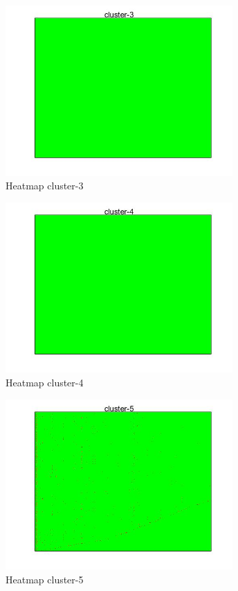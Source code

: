 \begin{figure}[htbp]
	\centering
	\includegraphics[height=6.5cm]{analisis/cluster-3.jpg}
	\caption{Heatmap cluster-3}
	\label{pic:cluster-3}
\end{figure}

\begin{figure}[htbp]
	\centering
	\includegraphics[height=6.5cm]{analisis/cluster-4.jpg}
	\caption{Heatmap cluster-4}
	\label{pic:cluster-4}
\end{figure}

\begin{figure}[htbp]
	\centering
	\includegraphics[height=6.5cm]{analisis/cluster-5.jpg}
	\caption{Heatmap cluster-5}
	\label{pic:cluster-5}
\end{figure}

